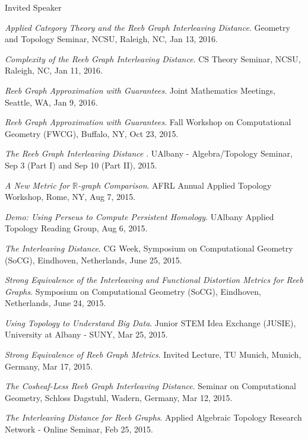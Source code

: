 \documentclass{resume} %
\begin{document}
\begin{rSection}{Invited Speaker}
\begin{etaremune}
\item\emph{Applied Category Theory and the Reeb Graph Interleaving Distance}. Geometry and Topology Seminar, NCSU, Raleigh, NC, Jan 13, 2016. 

\item\emph{Complexity of the Reeb Graph Interleaving Distance}. CS Theory Seminar, NCSU, Raleigh, NC, Jan 11, 2016. 

\item\emph{Reeb Graph Approximation with Guarantees}. Joint Mathematics Meetings, Seattle, WA, Jan 9, 2016. 

\item\emph{Reeb Graph Approximation with Guarantees}. Fall Workshop on Computational Geometry (FWCG), Buffalo, NY, Oct 23, 2015. 

\item\emph{The Reeb Graph Interleaving Distance }. UAlbany - Algebra/Topology Seminar, Sep 3 (Part I) and Sep 10 (Part II), 2015. 

\item\emph{A New Metric for $\mathbb{R}$-graph Comparison}. AFRL Annual Applied Topology Workshop, Rome, NY, Aug 7, 2015. 

\item\emph{Demo: Using Perseus to Compute Persistent Homology}. UAlbany Applied Topology Reading Group, Aug 6, 2015. 

\item\emph{The Interleaving Distance}. CG Week, Symposium on Computational Geometry (SoCG), Eindhoven, Netherlands, June 25, 2015. 

\item\emph{Strong Equivalence of the Interleaving and Functional Distortion Metrics for Reeb Graphs}. Symposium on Computational Geometry (SoCG), Eindhoven, Netherlands, June 24, 2015. 

\item\emph{Using Topology to Understand Big Data}. Junior STEM Idea Exchange (JUSIE), University at Albany - SUNY, Mar 25, 2015. 

\item\emph{Strong Equivalence of Reeb Graph Metrics}. Invited Lecture, TU Munich, Munich, Germany, Mar 17, 2015. 

\item\emph{The Cosheaf-Less Reeb Graph Interleaving Distance}. Seminar on Computational Geometry, Schloss Dagstuhl, Wadern, Germany, Mar 12, 2015. 

\item\emph{The Interleaving Distance for Reeb Graphs}. Applied Algebraic Topology Research Network - Online Seminar, Feb 25, 2015. 


\end{etaremune}
\end{rSection}
\end{document}
